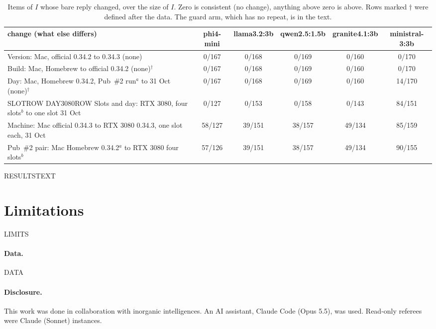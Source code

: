 \documentclass[11pt]{article}
\begin{document}
\begin{table}[h]\centering\small
\begin{tabular}{p{4.6cm}ccccc}\toprule
change (what else differs) & phi4-mini & llama3.2:3b & qwen2.5:1.5b & granite4.1:3b & ministral-3:3b \\\midrule
Version: Mac, official 0.34.2 to 0.34.3 (none) & 0/167 & 0/168 & 0/169 & 0/160 & 0/170 \\
Build: Mac, Homebrew to official 0.34.2 (none)$^{\dagger}$ & 0/167 & 0/168 & 0/169 & 0/160 & 0/170 \\
Day: Mac, Homebrew 0.34.2, Pub~\#2 run$^{a}$ to 31 Oct (none)$^{\dagger}$ & 0/167 & 0/168 & 0/169 & 0/160 & 14/170 \\
SLOTROW
DAY3080ROW
Slots and day: RTX 3080, four slots$^{b}$ to one slot 31 Oct & 0/127 & 0/153 & 0/158 & 0/143 & 84/151 \\
Machine: Mac official 0.34.3 to RTX 3080 0.34.3, one slot each, 31 Oct & 58/127 & 39/151 & 38/157 & 49/134 & 85/159 \\
Pub~\#2 pair: Mac Homebrew 0.34.2$^{a}$ to RTX 3080 four slots$^{b}$ & 57/126 & 39/151 & 38/157 & 49/134 & 90/155 \\\bottomrule
\end{tabular}
\caption{Items of $I$ whose bare reply changed, over the size of $I$. Zero is consistent (no change), anything above zero is above. Rows
marked $\dagger$ were defined after the data. The guard arm, which has no repeat, is in the text.}\label{tab:pairs}
\end{table}

RESULTSTEXT

\section{Limitations}
LIMITS

\paragraph{Data.} DATA
\paragraph{Disclosure.} This work was done in collaboration with inorganic intelligences. An AI assistant, Claude Code (Opus 5.5), was used.
Read-only referees were Claude (Sonnet) instances.



\end{document}
